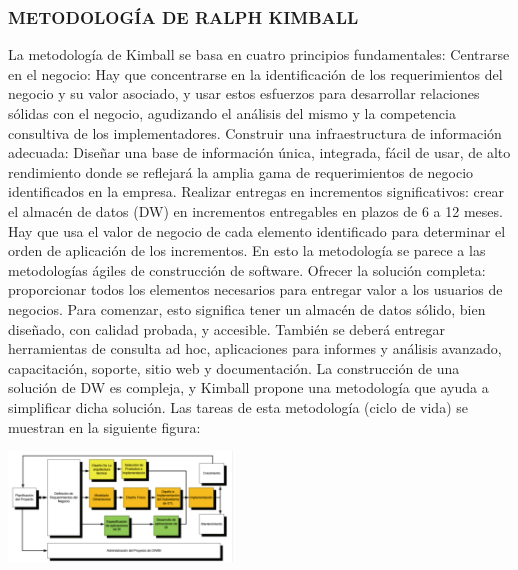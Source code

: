 \documentclass[twoside,twocolumn]{article}
\begin{document}
\subsubsection{METODOLOGÍA DE RALPH KIMBALL }
La metodología de Kimball se basa en cuatro principios fundamentales: 
Centrarse en el negocio: Hay que concentrarse en la identificación de 
los requerimientos del negocio y su valor asociado, y usar estos 
esfuerzos para desarrollar relaciones sólidas con el negocio, agudizando 
el análisis del mismo y la competencia consultiva de los 
implementadores. 
Construir una infraestructura de información adecuada: Diseñar una 
base de información única, integrada, fácil de usar, de alto rendimiento 
donde se reflejará la amplia gama de requerimientos de negocio 
identificados en la empresa. 
Realizar entregas en incrementos significativos: crear el almacén de 
datos (DW) en incrementos entregables en plazos de 6 a 12 meses. Hay 
que usa el valor de negocio de cada elemento identificado para 
determinar el orden de aplicación de los incrementos. En esto la 
metodología se parece a las metodologías ágiles de construcción de 
software. 
Ofrecer la solución completa: proporcionar todos los elementos 
necesarios para entregar valor a los usuarios de negocios. Para 
comenzar, esto significa tener un almacén de datos sólido, bien diseñado, 
con calidad probada, y accesible. También se deberá entregar 
herramientas de consulta ad hoc, aplicaciones para informes y análisis 
avanzado, capacitación, soporte, sitio web y documentación. 
La construcción de una solución de DW es compleja, y Kimball propone una 
metodología que ayuda a simplificar dicha solución. Las tareas de esta 
metodología (ciclo de vida) se muestran en la siguiente figura:

\includegraphics[width=6cm]{imagenes/img2.png}
\end{document}
